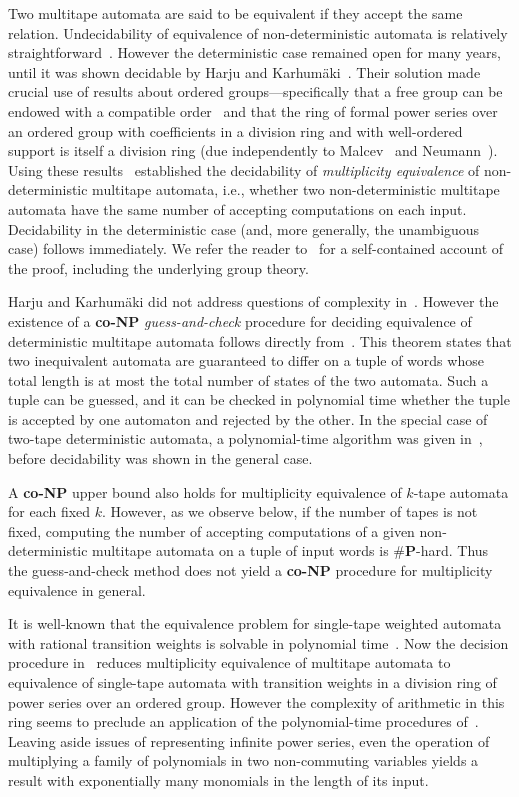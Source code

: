 \documentclass[runningheads]{llncs}
\begin{document}
Two multitape automata are said to be equivalent if they accept the
same relation.  Undecidability of equivalence of non-deterministic
automata is relatively straightforward~\cite{Griffiths68}.  However
the deterministic case remained open for many years, until it was
shown decidable by Harju and Karhum\"{a}ki~\cite{HarjuK91}.  Their
solution made crucial use of results about ordered
groups---specifically that a free group can be endowed with a
compatible order~\cite{Neumann49b} and that the ring of formal power
series over an ordered group with coefficients in a division ring and
with well-ordered support is itself a division ring (due independently
to Malcev~\cite{Malcev48} and Neumann~\cite{Neumann49}).  Using these
results~\cite{HarjuK91} established the decidability of
\emph{multiplicity equivalence} of non-deterministic multitape
automata, i.e., whether two non-deterministic multitape automata have
the same number of accepting computations on each input.  Decidability
in the deterministic case (and, more generally, the unambiguous case)
follows immediately.  We refer the reader to~\cite{Sakarovich03} for a
self-contained account of the proof, including the underlying group
theory.

Harju and Karhum\"{a}ki did not address questions of complexity
in~\cite{HarjuK91}.  However the existence of a \textbf{co-NP}
\emph{guess-and-check} procedure for deciding equivalence of
deterministic multitape automata follows directly from~\cite[Theorem
  8]{HarjuK91}.  This theorem states that two inequivalent automata
are guaranteed to differ on a tuple of words whose total length is at
most the total number of states of the two automata. Such a tuple can
be guessed, and it can be checked in polynomial time whether the tuple
is accepted by one automaton and rejected by the other.  In the
special case of two-tape deterministic automata, a polynomial-time
algorithm was given in~\cite{FriedmanG82}, before decidability was
shown in the general case.

A \textbf{co-NP} upper bound also holds for multiplicity equivalence
of $k$-tape automata for each fixed $k$.  However, as we observe
below, if the number of tapes is not fixed, computing the number of
accepting computations of a given non-deterministic multitape automata
on a tuple of input words is \#\textbf{P}-hard.  Thus the
guess-and-check method does not yield a \textbf{co-NP} procedure for
multiplicity equivalence in general.

It is well-known that the equivalence problem for single-tape weighted
automata with rational transition weights is solvable in polynomial
time~\cite{Schutzenberger61,Tzeng}.  Now the decision procedure
in~\cite{HarjuK91} reduces multiplicity equivalence of multitape
automata to equivalence of single-tape automata with transition
weights in a division ring of power series over an ordered group.
However the complexity of arithmetic in this ring seems to preclude an
application of the polynomial-time procedures
of~\cite{Schutzenberger61,Tzeng}.  Leaving aside issues of
representing infinite power series, even the operation of multiplying
a family of polynomials in two non-commuting variables yields a result
with exponentially many monomials in the length of its input.
\end{document}
